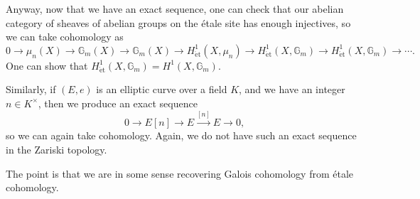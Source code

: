 \documentclass[../notes.tex]{subfiles}
\begin{document}
Anyway, now that we have an exact sequence, one can check that our abelian category of sheaves of abelian groups on the \'etale site has enough injectives, so we can take cohomology as
\[0\to\mu_n(X)\to\mathbb G_m(X)\to\mathbb G_m(X)\to H^1_{\mathrm{\acute et}}(X,\mu_n)\to H^1_{\mathrm{\acute et}}(X,\mathbb G_m)\to H^1_{\mathrm{\acute et}}(X,\mathbb G_m)\to\cdots.\]
One can show that $H^1_{\mathrm{\acute et}}(X,\mathbb G_m)=H^1(X,\mathbb G_m)$.
\begin{remark}
	Similarly, if $(E,e)$ is an elliptic curve over a field $K$, and we have an integer $n\in K^\times$, then we produce an exact sequence
	\[0\to E[n]\to E\stackrel{[n]}\to E\to0,\]
	so we can again take cohomology. Again, we do not have such an exact sequence in the Zariski topology.
\end{remark}
The point is that we are in some sense recovering Galois cohomology from \'etale cohomology.
\end{document}
